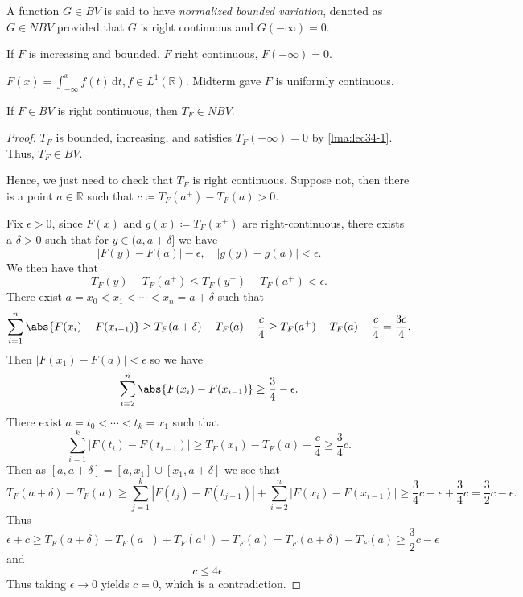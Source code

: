 \begin{definition}\label{def:normalized-bounded-variation}
	A function \(G \in BV\) is said to have \emph{normalized bounded variation}, denoted as \(G \in NBV\) provided that \(G\) is right continuous and \(G(-\infty) = 0\).
\end{definition}

\begin{eg}
	If \(F\) is increasing and bounded, \(F\) right continuous, \(F(-\infty) = 0\).

	\(F(x) = \int_{-\infty}^x f(t) \,\mathrm{d}t, f \in L^1(\mathbb{R})\). Midterm gave \(F\) is uniformly continuous.
\end{eg}

\begin{lemma}
	If \(F \in BV\) is right continuous, then \(T_F \in NBV\).
\end{lemma}
\begin{proof}
	\(T_F\) is bounded, increasing, and satisfies \(T_F(-\infty) = 0\) by \autoref{lma:lec34-1}. Thus, \(T_F \in BV\).

	Hence, we just need to check that \(T_F\) is right continuous. Suppose not, then there is a point \(a \in \mathbb{R}\) such that \(c \coloneqq T_F(a^+) - T_F(a) > 0\).

	Fix \(\epsilon > 0\), since \(F(x)\) and \(g(x) \coloneqq T_F(x^+)\) are right-continuous, there exists a \(\delta > 0\) such that for \(y \in (a,a+\delta]\) we have
	\[
		\left\vert F(y) - F(a) \right\vert - \epsilon ,\quad \left\vert g(y) - g(a) \right\vert < \epsilon .
	\]
	We then have that
	\[
		T_F(y) - T_F(a^+) \leq T_F(y^+) - T_F(a^+) < \epsilon .
	\]
	There exist \(a = x_0 < x_1 < \cdots < x_n = a + \delta\) such that
	\[
		\sum_{i=1}^n \abs{F(x_i) - F(x_{i-1})}  \geq T_F(a + \delta) - T_F(a) - \frac{c}{4} \geq T_F(a^+) - T_F(a) - \frac{c}{4} = \frac{3c}{4}.
	\]
	Then \(\left\vert F(x_1) - F(a) \right\vert < \epsilon \) so we have
	\[
		\sum_{i=2}^n \abs{F(x_i) - F(x_{i-1})} \geq \frac{3}{4} - \epsilon.
	\]
	There exist \(a = t_0 < \cdots < t_k = x_1\) such that
	\[
		\sum_{i=1}^k \left\vert F(t_i) - F(t_{i-1}) \right\vert \geq T_F(x_1) - T_F(a) - \frac{c}{4} \geq \frac{3}{4}c.
	\]
	Then as \([a,a+\delta] = [a,x_1] \cup [x_1,a+\delta]\) we see that
	\[
		T_F(a + \delta) - T_F(a) \geq \sum_{j=1}^k \left\vert F(t_j) - F(t_{j-1}) \right\vert + \sum_{i=2}^n \left\vert F(x_i) - F(x_{i-1}) \right\vert \geq \frac{3}{4}c - \epsilon + \frac{3}{4}c = \frac{3}{2}c - \epsilon.
	\]
	Thus
	\[
		\epsilon + c  \geq T_F(a + \delta) - T_F(a^+) + T_F(a^+) - T_F(a)  = T_F(a + \delta) - T_F(a) \geq \frac{3}{2}c - \epsilon
	\]
	and
	\[
		c \leq 4 \epsilon.
	\]
	Thus taking \(\epsilon \to 0\) yields \(c = 0\), which is a contradiction.
\end{proof}

